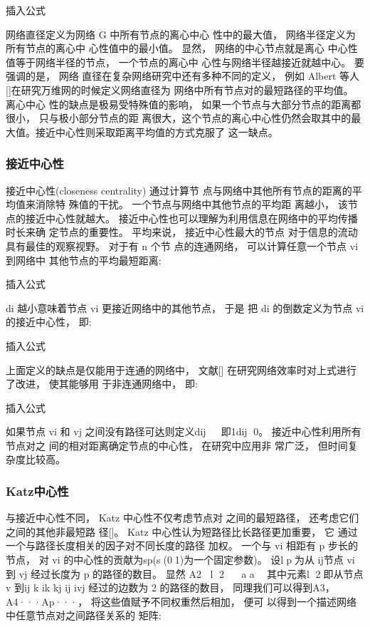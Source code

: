 				插入公式

				网络直径定义为网络 G 中所有节点的离心中心 性中的最大值， 网络半径定义为所有节点的离心中 心性值中的最小值。 显然， 网络的中心节点就是离心 中心性值等于网络半径的节点， 一个节点的离心中 心性与网络半径越接近就越中心。 要强调的是， 网络 直径在复杂网络研究中还有多种不同的定义， 例如 Albert 等人[]在研究万维网的时候定义网络直径为 网络中所有节点对的最短路径的平均值。 离心中心 性的缺点是极易受特殊值的影响， 如果一个节点与大部分节点的距离都很小， 只与极小部分节点的距 离很大，这个节点的离心中心性仍然会取其中的最大值。接近中心性则采取距离平均值的方式克服了 这一缺点。
	\subsubsection{接近中心性}
	接近中心性(closeness centrality) 通过计算节
	点与网络中其他所有节点的距离的平均值来消除特 殊值的干扰。 一个节点与网络中其他节点的平均距 离越小， 该节点的接近中心性就越大。 接近中心性也可以理解为利用信息在网络中的平均传播时长来确
	定节点的重要性。 平均来说， 接近中心性最大的节点 对于信息的流动具有最佳的观察视野。 对于有 n 个节 点的连通网络， 可以计算任意一个节点 vi 到网络中 其他节点的平均最短距离:

				插入公式

				di 越小意味着节点 vi 更接近网络中的其他节点， 于是 把 di 的倒数定义为节点 vi 的接近中心性， 即:

				插入公式

				上面定义的缺点是仅能用于连通的网络中， 文献[] 在研究网络效率时对上式进行了改进， 使其能够用 于非连通网络中， 即:

				插入公式

				如果节点 vi 和 vj 之间没有路径可达则定义dij ， 即1dij 0。 接近中心性利用所有节点对之 间的相对距离确定节点的中心性， 在研究中应用非 常广泛， 但时间复杂度比较高。
	\subsubsection{Katz中心性}
	与接近中心性不同， Katz 中心性不仅考虑节点对 之间的最短路径， 还考虑它们之间的其他非最短路 径[]。 Katz 中心性认为短路径比长路径更加重要， 它 通过一个与路径长度相关的因子对不同长度的路径 加权。 一个与 vi 相距有 p 步长的节点， 对 vi 的中心性的贡献为sp(s(0，1)为一个固定参数)。 设lp为从 ij节点 vi 到 vj 经过长度为 p 的路径的数目。 显然 A2 l 2 a a ， 其中元素l 2即从节点 v 到ij k ik kj ij ivj 经过的边数为 2 的路径的数目， 同理我们可以得到A3， A4···Ap···， 将这些值赋予不同权重然后相加， 便可 以得到一个描述网络中任意节点对之间路径关系的 矩阵:

